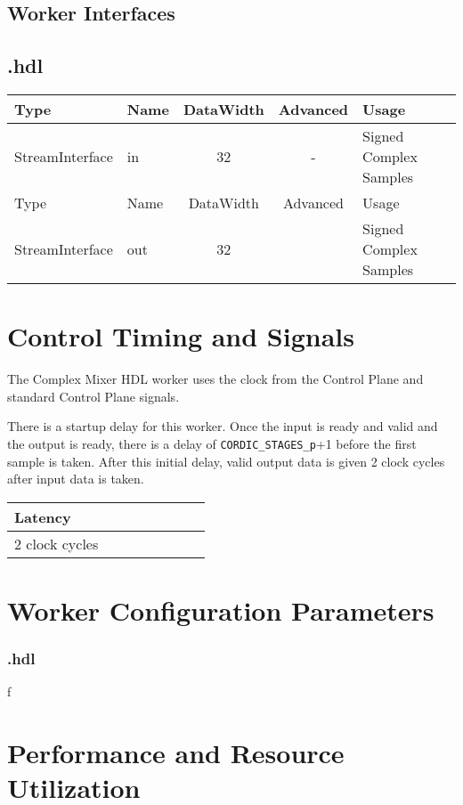 \begin{landscape}
	\section*{Worker Interfaces}
	\subsection*{\comp.hdl}
	\begin{scriptsize}
		\begin{tabular}{|M{2cm}|M{1.5cm}|c|c|M{12cm}|}
			\hline
			Type            & Name & DataWidth & Advanced  & Usage\\
			\hline
			StreamInterface & in   & 32        & -			& Signed Complex Samples\\
			\hline
			Type            & Name & DataWidth & Advanced	& Usage\\
			\hline
			StreamInterface & out  & 32        & 			& Signed Complex Samples\\
			\hline
		\end{tabular}
	\end{scriptsize}
\end{landscape}

\section*{Control Timing and Signals}
\begin{flushleft}
	The Complex Mixer HDL worker uses the clock from the Control Plane and standard Control Plane signals.\medskip

	There is a startup delay for this worker. Once the input is ready and valid and the output is ready, there is a delay of \verb+CORDIC_STAGES_p++1 before the first sample is taken. After this initial delay, valid output data is given 2 clock cycles after input data is taken.

	\begin{tabular}{|M{4.5cm}|M{1cm}|M{1cm}|M{1.5cm}|M{2cm}|M{1cm}|M{1cm}|M{2.5cm}|}
		\hline
		Latency         \\
		 clock cycles  \\
		\hline
	\end{tabular}
\end{flushleft}

\begin{landscape}
\section*{Worker Configuration Parameters}
\subsubsection*{\comp.hdl}
f%
\section*{Performance and Resource Utilization}
%
\end{landscape}
